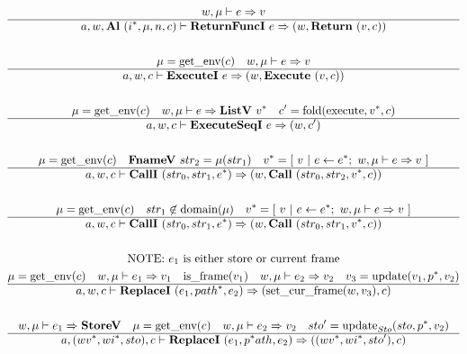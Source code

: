\begin{gather*}
%
\newline \\
  w, \mu \vdash e \Rightarrow v \\
  \hline
  a, w, \al ~ (\seq{i}, \mu, n, c) \vdash \returnfunci ~ e \Rightarrow (w, \ret ~ (v, c)) \\
%
\newline \\
  \mu = \getenv(c) \quad
  w, \mu \vdash e \Rightarrow v \\
  \hline
  a, w, c \vdash \executei ~ e \Rightarrow (w, \exe ~ (v, c)) \\
%
\newline \\
  \mu = \getenv(c) \quad
  w, \mu \vdash e \Rightarrow \listv ~ \seq v \quad
  c' = \fold(\execute, \seq v, c) \\
  \hline
  a, w, c \vdash \executeseqi ~ e \Rightarrow (w, c') \\
%
\newline \\
  \mu = \getenv(c) \quad
  \fnamev ~ str_2 = \mu(str_1) \quad
  \seq{v} = [ ~ v ~ | ~ e \leftarrow \seq{e}; ~ w, \mu \vdash e \Rightarrow v ~ ] \\
  \hline
  a, w, c \vdash \calli ~ (str_0, str_1, \seq e) \Rightarrow (w, \call ~ (str_0, str_2, \seq v, c)) \\
%
\newline \\
  \mu = \getenv(c) \quad
  str_1 \not\in \domain(\mu) \quad
  \seq{v} = [ ~ v ~ | ~ e \leftarrow \seq{e}; ~ w, \mu \vdash e \Rightarrow v ~ ] \\
  \hline
  a, w, c \vdash \calli ~ (str_0, str_1, \seq e) \Rightarrow (w, \call ~ (str_0, str_1, \seq v, c)) \\
%
\newline \\
\text{NOTE: $e_1$ is either store or current frame} \\
  \mu = \getenv(c) \quad
  w, \mu \vdash e_1 \Rightarrow v_1 \quad
  \isframe(v_1) \quad
  w, \mu \vdash e_2 \Rightarrow v_2 \quad
  v_3 = \update(v_1, \seq p, v_2) \\
  \hline
  a, w, c \vdash \replacei ~ (e_1, \seq{path}, e_2) \Rightarrow (\setcurframe(w, v_3), c) \\
%
\newline \\
  w, \mu \vdash e_1 \Rightarrow \storev \quad
  \mu = \getenv(c) \quad
  w, \mu \vdash e_2 \Rightarrow v_2 \quad
  sto' = \update_{Sto}(sto, \seq p, v_2) \\
  \hline
  a, (\seq{wv}, \seq{wi}, sto), c \vdash \replacei ~ (e_1, \seq path, e_2)
  \Rightarrow ((\seq{wv}, \seq{wi}, sto'), c) \\
\end{gather*}





